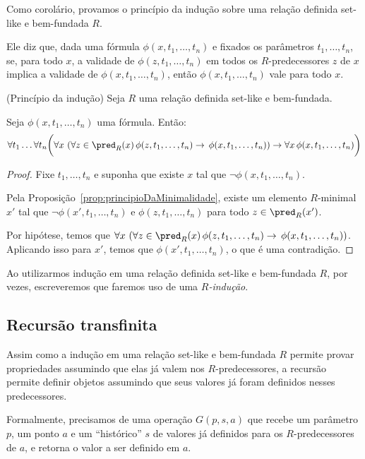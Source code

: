 Como corolário, provamos o princípio da indução sobre uma relação definida set-like e bem-fundada $R$.

Ele diz que, dada uma fórmula $\phi(x, t_1, \dots, t_n)$ e fixados os parâmetros $t_1, \dots, t_n$, se, para todo $x$, a validade de $\phi(z, t_1, \dots, t_n)$ em todos os $R$-predecessores $z$ de $x$ implica a validade de $\phi(x, t_1, \dots, t_n)$, então $\phi(x, t_1, \dots, t_n)$ vale para todo $x$.

\begin{corollary}[$\ZFmP$](Princípio da indução)\label{cor:principioDaInducao}
    Seja $R$ uma relação definida set-like e bem-fundada.
    
    Seja $\phi(x, t_1, \dots, t_n)$ uma fórmula.
    Então:
    \[
        \forall t_1\dots \forall t_n\bigg(\forall x \, \left(\forall z \in \pred_{R}(x) \, \phi(z, t_1, \dots, t_n) \rightarrow \, \phi(x, t_1, \dots, t_n)\right)\rightarrow \forall x\, \phi(x, t_1, \dots, t_n)\bigg)
    \]
\end{corollary}

\begin{proof}
    Fixe $t_1, \dots, t_n$ e suponha que existe $x$ tal que $\neg \phi(x, t_1, \dots, t_n)$.

    Pela Proposição~\ref{prop:principioDaMinimalidade}, existe um elemento $R$-minimal $x'$ tal que $\neg \phi(x', t_1, \dots, t_n)$ e $\phi(z, t_1, \dots, t_n)$ para todo $z\in \pred_{R}(x')$.

    Por hipótese, temos que $\forall x \, \left(\forall z \in \pred_{R}(x) \, \phi(z, t_1, \dots, t_n) \rightarrow \, \phi(x, t_1, \dots, t_n)\right)$.
    Aplicando isso para $x'$, temos que $\phi(x', t_1, \dots, t_n)$, o que é uma contradição.
\end{proof}

Ao utilizarmos indução em uma relação definida set-like e bem-fundada $R$, por vezes, escreveremos que faremos uso de uma \emph{$R$-indução}.

\subsection{Recursão transfinita}
Assim como a indução em uma relação set-like e bem-fundada $R$ permite provar propriedades assumindo que elas já valem nos $R$-predecessores, a recursão permite definir objetos assumindo que seus valores já foram definidos nesses predecessores.

Formalmente, precisamos de uma operação $G(p, s, a)$ que recebe um parâmetro $p$, um ponto $a$ e um ``histórico'' $s$ de valores já definidos para os $R$-predecessores de $a$, e retorna o valor a ser definido em $a$.

